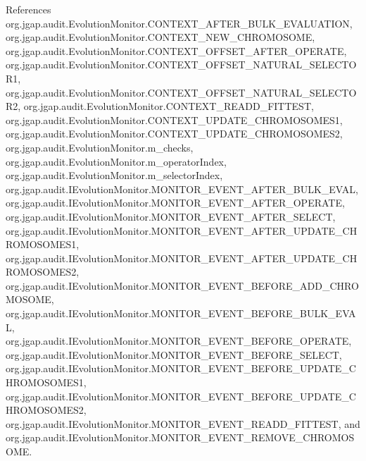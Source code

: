 References org.\-jgap.\-audit.\-Evolution\-Monitor.\-C\-O\-N\-T\-E\-X\-T\-\_\-\-A\-F\-T\-E\-R\-\_\-\-B\-U\-L\-K\-\_\-\-E\-V\-A\-L\-U\-A\-T\-I\-O\-N, org.\-jgap.\-audit.\-Evolution\-Monitor.\-C\-O\-N\-T\-E\-X\-T\-\_\-\-N\-E\-W\-\_\-\-C\-H\-R\-O\-M\-O\-S\-O\-M\-E, org.\-jgap.\-audit.\-Evolution\-Monitor.\-C\-O\-N\-T\-E\-X\-T\-\_\-\-O\-F\-F\-S\-E\-T\-\_\-\-A\-F\-T\-E\-R\-\_\-\-O\-P\-E\-R\-A\-T\-E, org.\-jgap.\-audit.\-Evolution\-Monitor.\-C\-O\-N\-T\-E\-X\-T\-\_\-\-O\-F\-F\-S\-E\-T\-\_\-\-N\-A\-T\-U\-R\-A\-L\-\_\-\-S\-E\-L\-E\-C\-T\-O\-R1, org.\-jgap.\-audit.\-Evolution\-Monitor.\-C\-O\-N\-T\-E\-X\-T\-\_\-\-O\-F\-F\-S\-E\-T\-\_\-\-N\-A\-T\-U\-R\-A\-L\-\_\-\-S\-E\-L\-E\-C\-T\-O\-R2, org.\-jgap.\-audit.\-Evolution\-Monitor.\-C\-O\-N\-T\-E\-X\-T\-\_\-\-R\-E\-A\-D\-D\-\_\-\-F\-I\-T\-T\-E\-S\-T, org.\-jgap.\-audit.\-Evolution\-Monitor.\-C\-O\-N\-T\-E\-X\-T\-\_\-\-U\-P\-D\-A\-T\-E\-\_\-\-C\-H\-R\-O\-M\-O\-S\-O\-M\-E\-S1, org.\-jgap.\-audit.\-Evolution\-Monitor.\-C\-O\-N\-T\-E\-X\-T\-\_\-\-U\-P\-D\-A\-T\-E\-\_\-\-C\-H\-R\-O\-M\-O\-S\-O\-M\-E\-S2, org.\-jgap.\-audit.\-Evolution\-Monitor.\-m\-\_\-checks, org.\-jgap.\-audit.\-Evolution\-Monitor.\-m\-\_\-operator\-Index, org.\-jgap.\-audit.\-Evolution\-Monitor.\-m\-\_\-selector\-Index, org.\-jgap.\-audit.\-I\-Evolution\-Monitor.\-M\-O\-N\-I\-T\-O\-R\-\_\-\-E\-V\-E\-N\-T\-\_\-\-A\-F\-T\-E\-R\-\_\-\-B\-U\-L\-K\-\_\-\-E\-V\-A\-L, org.\-jgap.\-audit.\-I\-Evolution\-Monitor.\-M\-O\-N\-I\-T\-O\-R\-\_\-\-E\-V\-E\-N\-T\-\_\-\-A\-F\-T\-E\-R\-\_\-\-O\-P\-E\-R\-A\-T\-E, org.\-jgap.\-audit.\-I\-Evolution\-Monitor.\-M\-O\-N\-I\-T\-O\-R\-\_\-\-E\-V\-E\-N\-T\-\_\-\-A\-F\-T\-E\-R\-\_\-\-S\-E\-L\-E\-C\-T, org.\-jgap.\-audit.\-I\-Evolution\-Monitor.\-M\-O\-N\-I\-T\-O\-R\-\_\-\-E\-V\-E\-N\-T\-\_\-\-A\-F\-T\-E\-R\-\_\-\-U\-P\-D\-A\-T\-E\-\_\-\-C\-H\-R\-O\-M\-O\-S\-O\-M\-E\-S1, org.\-jgap.\-audit.\-I\-Evolution\-Monitor.\-M\-O\-N\-I\-T\-O\-R\-\_\-\-E\-V\-E\-N\-T\-\_\-\-A\-F\-T\-E\-R\-\_\-\-U\-P\-D\-A\-T\-E\-\_\-\-C\-H\-R\-O\-M\-O\-S\-O\-M\-E\-S2, org.\-jgap.\-audit.\-I\-Evolution\-Monitor.\-M\-O\-N\-I\-T\-O\-R\-\_\-\-E\-V\-E\-N\-T\-\_\-\-B\-E\-F\-O\-R\-E\-\_\-\-A\-D\-D\-\_\-\-C\-H\-R\-O\-M\-O\-S\-O\-M\-E, org.\-jgap.\-audit.\-I\-Evolution\-Monitor.\-M\-O\-N\-I\-T\-O\-R\-\_\-\-E\-V\-E\-N\-T\-\_\-\-B\-E\-F\-O\-R\-E\-\_\-\-B\-U\-L\-K\-\_\-\-E\-V\-A\-L, org.\-jgap.\-audit.\-I\-Evolution\-Monitor.\-M\-O\-N\-I\-T\-O\-R\-\_\-\-E\-V\-E\-N\-T\-\_\-\-B\-E\-F\-O\-R\-E\-\_\-\-O\-P\-E\-R\-A\-T\-E, org.\-jgap.\-audit.\-I\-Evolution\-Monitor.\-M\-O\-N\-I\-T\-O\-R\-\_\-\-E\-V\-E\-N\-T\-\_\-\-B\-E\-F\-O\-R\-E\-\_\-\-S\-E\-L\-E\-C\-T, org.\-jgap.\-audit.\-I\-Evolution\-Monitor.\-M\-O\-N\-I\-T\-O\-R\-\_\-\-E\-V\-E\-N\-T\-\_\-\-B\-E\-F\-O\-R\-E\-\_\-\-U\-P\-D\-A\-T\-E\-\_\-\-C\-H\-R\-O\-M\-O\-S\-O\-M\-E\-S1, org.\-jgap.\-audit.\-I\-Evolution\-Monitor.\-M\-O\-N\-I\-T\-O\-R\-\_\-\-E\-V\-E\-N\-T\-\_\-\-B\-E\-F\-O\-R\-E\-\_\-\-U\-P\-D\-A\-T\-E\-\_\-\-C\-H\-R\-O\-M\-O\-S\-O\-M\-E\-S2, org.\-jgap.\-audit.\-I\-Evolution\-Monitor.\-M\-O\-N\-I\-T\-O\-R\-\_\-\-E\-V\-E\-N\-T\-\_\-\-R\-E\-A\-D\-D\-\_\-\-F\-I\-T\-T\-E\-S\-T, and org.\-jgap.\-audit.\-I\-Evolution\-Monitor.\-M\-O\-N\-I\-T\-O\-R\-\_\-\-E\-V\-E\-N\-T\-\_\-\-R\-E\-M\-O\-V\-E\-\_\-\-C\-H\-R\-O\-M\-O\-S\-O\-M\-E.

